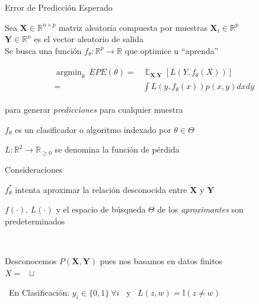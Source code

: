 \documentclass[xcolor=x11names]{beamer}
\DeclareMathOperator{\Expect}{\mathbb{E}}
\DeclareMathOperator{\trainsetn}{\mathcal{T}^{(n)}}
\DeclareMathOperator{\testsetn}{\mathcal{T_s}^{(n)}}
\begin{document}
\begin{frame}{Error de Predicción Esperado}
		\centering

		Sea $\textbf{X} \in \mathbb{R}^{n \times p}$ matriz aleatoria compuesta por muestras $\textbf{X}_i \in \mathbb{R}^{p}$\\
		$\textbf{Y} \in \mathbb{R}^n$ es el vector aleatorio de salida \\
		Se busca una función $f_\theta: \mathbb{R}^{p} \rightarrow  \mathbb{R}$ que optimice u ``aprenda''

	\begin{align*}%
		\begin{split}
		\operatorname{argmin}_{\theta} \  EPE(\theta) = & \Expect_{\textbf{X},\textbf{Y}} \left[ L(Y,f_\theta(X))\right]  \\
			= & \int L(y,f_\theta (x)) p(x,y) dx dy
		\end{split}
	\end{align*}

	para generar \textit{predicciones} para cualquier muestra

	\smallskip
	$f_\theta$ es un clasificador o algoritmo indexado por $\theta \in \Theta$

	\smallskip
	$L: \mathbb{R}^{2} \rightarrow  \mathbb{R}_{\geq 0}$ se denomina la función de pérdida


\end{frame}

\begin{frame}{Consideraciones}

	$f_\theta^*$ intenta aproximar la relación desconocida entre $\textbf{X}$ y $\textbf{Y}$

	\bigskip

	$f(\cdot)$, $L(\cdot)$ y el espacio de búsqueda $\Theta$ de los \textit{aproximantes} son predeterminados

	\bigskip\
	
	Desconocemos $P(\textbf{X},\textbf{Y})$ pues nos basamos en datos finitos\\

	$X = \trainsetn  \sqcup \testsetn $

	\bigskip\
	En Clasificación: $y_i \in \{0,1\} \ \forall  i$ \ y \ $L(z,w) =  \mathbb{I}(z \neq w ) $

\end{frame}

\end{document}
